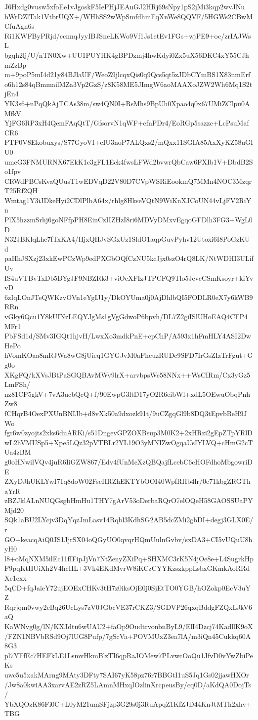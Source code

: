 J6Hxdg0vusw5xfoEe1vJgoskF5IePHjJEAuGJ2HRj69sNpy1pS2jMi3kqp2wvJNu
bWrDZlTak1VtbrUQX+/WHhSS2wWpSmfdhmFqXnWe8QQVF/5HGWs2CBwMCfuAgn6s
Ri1KWFByPRjd/ccnnqJyyIBJSneLKWo9Vf1Js1etEv1FGs+wjPE9+oc/zrIAJWsL
bgqh2lj/U/nTN0Xw+UU1PUYHK4gBPDzmj4hwKdyi0Zx5uX56DKC4xY55CJhmZzBp
m+9poP5mI4d21y84BJlaUF/WeoZ9jlcqxQis0q9Qcs5qt5zJDbCYmBS1X83nmErf
o6h12s84qBmmailMZa3Vp2GzS/z8K58ME5JImgW6aoMAAXoJZW2Wh6Mq1S2tjEn4
YK3s6+nPqQkAjTCAs38m/sw4QN0I+RsMhs9BpUh0Xpao4q0x67UMiZCIpu0AMfkV
YjFG6RP3xH4QemFAqQtT/GfsorvN1qWF+cfnPDr4/EoRGp5sazzc+LcPsuMafCR6
PTP0V8Ekobuxys/S77GyoVI+cIU3noP7ALQxs2/mQxx11SGIA85AxXyKZ58uGIU0
umcG3FNMURNX67EkK1c3gFL1Eck4fwsLFWd2bvwrQbCaw6FXIb1V+DbdB2So1fpv
CRWdPBCsKvaQUusT1wEDVqD22V80D7CVpWSRiEookmQ7MMn4NOC3MzqrT25Rf2QH
Wmtag1Y3iJDkeHyi2CDlPlbA64x/rhlg8HkseVQtN9WiKnXJCoUN44vLjFV2RiYn
PlX5hzzmSrhj6goNFfpPH8EinCzIIZHzI8ri6MDVyDMxvEgqoGFDlh3FG3+WgL0D
N32JBKlqLhc7fTxKA4/HjxQHJvSGxUz1SldO1aqpGuvPyhv12Utoxi6I8PoGzKUd
paHhJSXzj23xkEwPCzWp9edPXGbOQfCzNU5kcJjx0szO4rQ8LK/NtWDHI3ULifUv
IS4uVTBvTxDb5BYgJF9NBZRk3+viOeXFIzJTPCFQ9Tlo5JevcCSmKsoyr+kiYvvD
6zIqLOnJTeQWKzvOVn1eYgIJ1y/DkOYUma0j0AjDhlbQI5FODLR0eX7y6kWB9RRn
vGky6Qcu1Y8kUINzLEQYJgMs1gVgGdwoP6bpvh/DL7Z2giISlUHoEAQ4CFP4MFr1
PbFSd1d/SMv3IGQt1hjvH/LwxXo3mdkPnE+cpChP/A593x1hFmHLY4ASI2DwHePo
hVomKOaa8mRJWa8wG8jUieq1GYGJvM0aFhcuzRUDc9SFD7IrGsZIzTrFgut+Gg0o
XKgFQ/kXVsJBtPaSGQBAvMWv9lrX+arvbpsWc58NNx++WsCIRm/Cx3yGz5LmFSh/
nz81CP5gkV+7vA3ucbQcQ+f/90EwpG3ltD17yO2R6eibWl+xdL5OEwuObqPnhZw8
fCHqrB4OexPXUnBNIJb+d8vXk50a9dxozk91t/9uCZgqGl9b8DQ3tEpvbBeH9JWo
fgr6w0zyojts2xks6duARKi/s51DngevGPZOXBsup3M0K2+2xHRzi2gEpZTpYRlD
wL2hVMUSp5+Xpe5LQz32pVTBLr2YL19O3yMNIZwOgqaUsIYLVQ+cHmG2cTUa4zBM
g0oHNwilVQv4juR6IiGZW867/Edv4fUnMcXzQBQajfLcebC6cHOFdhoMbgowriDE
ZXyDJhUKLYwI71q8doW02FscHRZhEKTYbOOI40WpfRHb4lr/0e71kbgZRGThaYrR
zBZJklALnNUQGsgbHmHu1THY7gArV53oDerbaRQrO7elOQeH58GAOSSUaPYMjd20
SQk1aBU2LYcjv3DqYqzJmLasv14Rqbl3KdhSG2AB5dcZMi2gbDI+degj3GLX0E/r
GO+keacqAiQ0JS1JjrSX04oQGyUO0qvqrHQmUulnGvbv/sxDA3+CI5vUQuU8hyH0
l8+oMqNXM5ilEc11fIFipJjVn7NtZenyZXiPq+SHXMC3rK5N4jOe8e+L4SugrkHp
F9pqKtHUiXh2V4hcHL+3Vk4EKdMvrW8iKCzCYYKzszkppLsbxGKmkAoRRdXc1exx
5qCD+fqJaieY72ujEOExCHKv3tH7z0iksOjE0j0SjEtTO0YGB/hOZokp0EcV3uYZ
Rqrjqm0vwy2cBq26UcLys7zV0JGbcVE37rCKZ3/SGDVP26qxqBddgFZQxLJkV6aQ
KaWNvg0g/lN/KXJdtu6wUAU2+faOp9OudtrvonbnByL9/ElI4Dzcj74KadllK9oX
/FZN1NBVbRSd9Oj7lUG8Pufp/7gScVa+POVMUxZ3ea7lA/m3iQn45Cukkq60A8G3
pl7YFfEc7HEFkLE1LsmvHkmBlzTI6qpRaJOMew7PLvwcOoQu1JfvD0vYwZbiPeKs
uwc5u5xakMArng9MAty3DFty7SAI67yK58pz76r7BBGtI1uS5Jq1Gs02jjawHXOr
/Jw8a0kwiAA3xarvAE2zRZ5LAmnMHxqIOzlinXrcpeusBy/cq0D/aKdQA0DojTs/
YbXQOzK86Fi0C+L0yM21umSFjzp3G29s0j3RuApqZ1KfZJD44KnJtMTh2xhv+TBG
